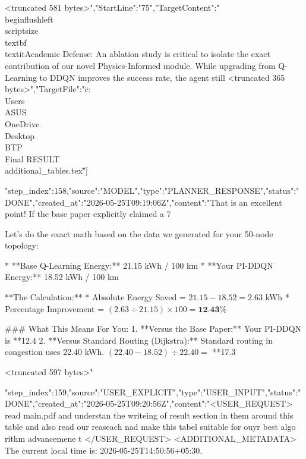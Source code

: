 \begin{table}[t]
{\begin{table}[t]
{{{{{{{{{{{{{{{<truncated 581 bytes>","StartLine":"75","TargetContent":"\"\\begin{flushleft}\
\\scriptsize \\textbf{\\textit{Academic Defense:}} An ablation study is critical to isolate the exact contribution of our novel Physics-Informed module. While upgrading from Q-Learning to DDQN improves the success rate, the agent still
<truncated 365 bytes>","TargetFile":"\"c:\\Users\\ASUS\\OneDrive\\Desktop\\BTP\\Final RESULT\\additional_tables.tex\""}}]}
{"step_index":158,"source":"MODEL","type":"PLANNER_RESPONSE","status":"DONE","created_at":"2026-05-25T09:19:06Z","content":"That is an excellent point! If the base paper explicitly claimed a 7%

Let's do the exact math based on the data we generated for your 50-node topology:

*   **Base Q-Learning Energy:** 21.15 kWh / 100 km
*   **Your PI-DDQN Energy:** 18.52 kWh / 100 km

**The Calculation:**
*   Absolute Energy Saved = $21.15 - 18.52 = 2.63$ kWh
*   Percentage Improvement = $(2.63 \div 21.15) \times 100 = \textbf{12.43\%}$

### What This Means For You:
1.  **Versus the Base Paper:** Your PI-DDQN is **12.4%
2.  **Versus Standard Routing (Dijkstra):** Standard routing in congestion uses 22.40 kWh. $(22.40 - 18.52) \div 22.40 =$ **17.3%

<truncated 597 bytes>"}
{"step_index":159,"source":"USER_EXPLICIT","type":"USER_INPUT","status":"DONE","created_at":"2026-05-25T09:20:56Z","content":"<USER_REQUEST>
read main.pdf and understan the writeing of result section in them around this table and also read our reaseach nad make this tabel suitable for ouyr best algo rithm advancemene t 
</USER_REQUEST>
<ADDITIONAL_METADATA>
The current local time is: 2026-05-25T14:50:56+05:30.

}}}}}}}}}}}}}
\end{table}}
\end{table}
